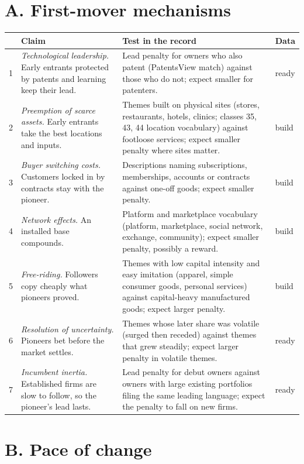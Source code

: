 \section*{A. First-mover mechanisms \citep{LiebermanMontgomery1988}}

\begin{longtable}{p{0.4cm}p{5.3cm}p{6.2cm}p{1.5cm}}
\toprule
& Claim & Test in the record & Data \\
\midrule
\endhead
1 & \emph{Technological leadership.} Early entrants protected by patents
and learning keep their lead. & Lead penalty for owners who also patent
(PatentsView match) against those who do not; expect smaller for
patenters. & ready \\
2 & \emph{Preemption of scarce assets.} Early entrants take the best
locations and inputs. & Themes built on physical sites (stores,
restaurants, hotels, clinics; classes 35, 43, 44 location vocabulary)
against footloose services; expect smaller penalty where sites matter. &
build \\
3 & \emph{Buyer switching costs.} Customers locked in by contracts stay
with the pioneer. & Descriptions naming subscriptions, memberships,
accounts or contracts against one-off goods; expect smaller penalty. &
build \\
4 & \emph{Network effects.} An installed base compounds. & Platform and
marketplace vocabulary (platform, marketplace, social network,
exchange, community); expect smaller penalty, possibly a reward. &
build \\
5 & \emph{Free-riding.} Followers copy cheaply what pioneers proved. &
Themes with low capital intensity and easy imitation (apparel, simple
consumer goods, personal services) against capital-heavy manufactured
goods; expect larger penalty. & build \\
6 & \emph{Resolution of uncertainty.} Pioneers bet before the market
settles. & Themes whose later share was volatile (surged then receded)
against themes that grew steadily; expect larger penalty in volatile
themes. & ready \\
7 & \emph{Incumbent inertia.} Established firms are slow to follow, so
the pioneer's lead lasts. & Lead penalty for debut owners against
owners with large existing portfolios filing the same leading language;
expect the penalty to fall on new firms. & ready \\
\bottomrule
\end{longtable}

\section*{B. Pace of change \citep{SuarezLanzolla2007}}

